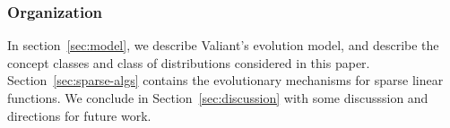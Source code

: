 \subsubsection*{Organization}

In section~\ref{sec:model}, we describe Valiant's evolution model, and describe
the concept classes and class of distributions considered in this paper.
Section~\ref{sec:sparse-algs} contains the evolutionary mechanisms for sparse
linear functions. We conclude in Section~\ref{sec:discussion} with some
discusssion and directions for future work.
